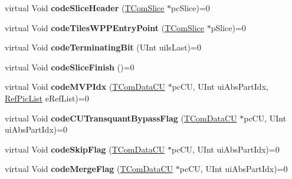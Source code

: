 \begin{DoxyCompactItemize}
\item 
\mbox{\label{class_t_enc_entropy_if_a1d3d8764cc34e672cd1a5d0e0ce3b728}} 
virtual Void {\bfseries code\+Slice\+Header} (\hyperlink{class_t_com_slice}{T\+Com\+Slice} $\ast$pc\+Slice)=0
\item 
\mbox{\label{class_t_enc_entropy_if_a7bd9d1ab9aa9498c12b89eb80851b425}} 
virtual Void {\bfseries code\+Tiles\+W\+P\+P\+Entry\+Point} (\hyperlink{class_t_com_slice}{T\+Com\+Slice} $\ast$p\+Slice)=0
\item 
\mbox{\label{class_t_enc_entropy_if_a589a77f8500489d0772888b3ccfd8f59}} 
virtual Void {\bfseries code\+Terminating\+Bit} (U\+Int uils\+Last)=0
\item 
\mbox{\label{class_t_enc_entropy_if_a68f105170927c66a1c99a89f564a8b9b}} 
virtual Void {\bfseries code\+Slice\+Finish} ()=0
\item 
\mbox{\label{class_t_enc_entropy_if_ae66a2748c2a9529210c59b1538232b33}} 
virtual Void {\bfseries code\+M\+V\+P\+Idx} (\hyperlink{class_t_com_data_c_u}{T\+Com\+Data\+CU} $\ast$pc\+CU, U\+Int ui\+Abs\+Part\+Idx, \hyperlink{_type_def_8h_a93cea48eb9dcfd661168dee82e41b384}{Ref\+Pic\+List} e\+Ref\+List)=0
\item 
\mbox{\label{class_t_enc_entropy_if_a4808c8f28b6c243bc3afdb7bf7f1c193}} 
virtual Void {\bfseries code\+C\+U\+Transquant\+Bypass\+Flag} (\hyperlink{class_t_com_data_c_u}{T\+Com\+Data\+CU} $\ast$pc\+CU, U\+Int ui\+Abs\+Part\+Idx)=0
\item 
\mbox{\label{class_t_enc_entropy_if_a886316ac57705981aa2a022aff764cb7}} 
virtual Void {\bfseries code\+Skip\+Flag} (\hyperlink{class_t_com_data_c_u}{T\+Com\+Data\+CU} $\ast$pc\+CU, U\+Int ui\+Abs\+Part\+Idx)=0
\item 
\mbox{\label{class_t_enc_entropy_if_a1607dbac9182c8e2f6c01b7cfdcc35d6}} 
virtual Void {\bfseries code\+Merge\+Flag} (\hyperlink{class_t_com_data_c_u}{T\+Com\+Data\+CU} $\ast$pc\+CU, U\+Int ui\+Abs\+Part\+Idx)=0
\item 
\mbox{\label{class_t_enc_entropy_if_aac07298a28857e63c100148b10f29ba7}} 

\end{DoxyCompactItemize}
